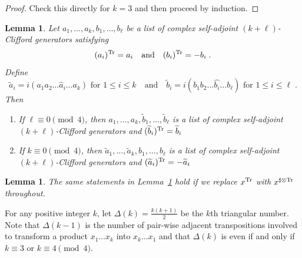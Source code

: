 \documentclass[12pt, reqno]{amsart}
\newtheorem{lemma}[thm]{Lemma}
\theoremstyle{definition}
\def\T{{\mathbb T}}
\def\T{ ^{\rm{Tr}}}
\def\sT{ ^{\sharp \otimes {\rm{Tr}}}}
\begin{document}
\begin{proof}
Check this directly for $k = 3$ and then proceed by induction.
\end{proof}

\begin{lemma} \label{transpose}
Let $a_1, \dots, a_k, b_1, \dots, b_\ell$ be a list of complex self-adjoint $(k + \ell)$-Clifford generators satisfying
$$(a_i)\T = a_i \quad \text{and} \quad (b_i)\T = -b_i \; .$$
Define 
$$\widetilde a_i = i (a_1 a_2 \dots \widehat a _i \dots a_k) \text{~for $1 \leq i \leq k$} 
\quad \text{and} \quad \widetilde b _i = i (b_1 b_2 \dots \widehat{b_i} \dots b_\ell) \text{~for $1 \leq i \leq \ell$} \; .
$$
Then
\begin{enumerate}
\item If $\ell \equiv 0 \pmod 4$, then
$a_1, \dots, a_k, \widetilde b_1, \dots, \widetilde b_\ell$ is a list of complex self-adjoint $(k + \ell)$-Clifford generators 
and $(\widetilde{b}_i)\T = \widetilde{b}_i$
\item If $k \equiv 0 \pmod 4$, then
$\widetilde{a}_1, \dots, \widetilde{a}_k, b_1, \dots, b_\ell$ is a list of complex self-adjoint $(k + \ell)$-Clifford generators 
and $(\widetilde{a}_i)\T = -\widetilde{a}_i$
\end{enumerate}
\end{lemma}

\begin{lemma} \label{sharp}
The same statements in Lemma~\ref{transpose} hold if we replace $x\T$ with $x\sT$ throughout.
\end{lemma}

For any positive integer $k$, let $\Delta(k) =\tfrac{k(k+1)}{2}$ be the $k$th triangular number. Note that $\Delta(k-1)$ is the number of pair-wise adjacent transpositions involved to transform a product $x_1 \dots x_k $ into $ x_k \dots x_1$ and that $\Delta(k)$ is even if and only if $k \equiv 3$ or $k \equiv 4 \pmod 4$.
\end{document}
